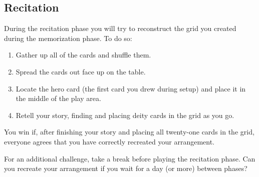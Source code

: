 \subsection*{Recitation}

During the recitation phase you will try to reconstruct the grid you created during the memorization phase. To do so:
\begin{enumerate}[leftmargin=*]
\item Gather up all of the cards and shuffle them.
\item Spread the cards out face up on the table.
\item Locate the hero card (the first card you drew during setup) and place it in the middle of the play area.
\item Retell your story, finding and placing deity cards in the grid as you go.
\end{enumerate}

You win if, after finishing your story and placing all twenty-one cards in the grid, everyone agrees that you have correctly recreated your arrangement.

For an additional challenge, take a break before playing the recitation phase.
Can you recreate your arrangement if you wait for a day (or more) between phases?



